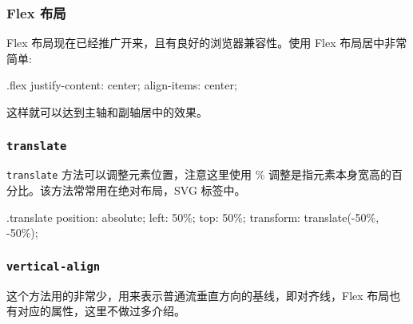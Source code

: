 \subsubsection*{Flex 布局}

Flex 布局现在已经推广开来，且有良好的浏览器兼容性。使用 Flex 布局居中非常简单:

\begin{HTML}
.flex {
  justify-content: center;
  align-items: center;
}
\end{HTML}

这样就可以达到主轴和副轴居中的效果。

\subsubsection*{\texttt{translate}}

\texttt{translate} 方法可以调整元素位置，注意这里使用 \% 调整是指元素本身宽高的百分比。该方法常常用在绝对布局，SVG 标签中。

\begin{HTML}
  .translate {
    position: absolute;
    left: 50\%;
    top: 50\%;
    transform: translate(-50\%, -50\%);
    }
  \end{HTML}
  
\subsubsection*{\texttt{vertical-align}}

这个方法用的非常少，用来表示普通流垂直方向的基线，即对齐线，Flex 布局也有对应的属性，这里不做过多介绍。